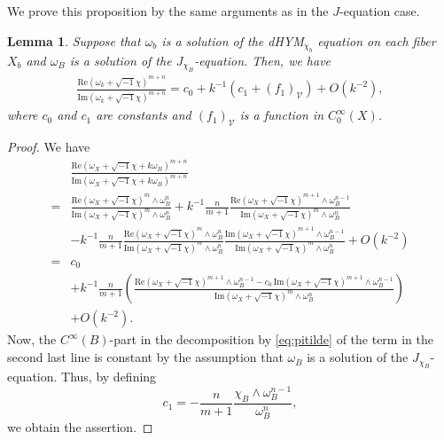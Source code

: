 \documentclass{amsart}
\numberwithin{equation}{section}
\theoremstyle{plain}
\newtheorem{lemma}[equation]{Lemma}
\theoremstyle{definition}
\theoremstyle{remark}
\begin{document}
We prove this proposition by the same arguments as in the $J$-equation case.

\begin{lemma}\label{lem:dhymO(1)-term}
Suppose that $\omega_b$ is a solution of the dHYM$_{\chi_b}$ equation on each fiber $X_b$ and $\omega_B$ is a solution of the $J_{\chi_B}$-equation. Then, we have
\begin{align*}
    \frac{\mathrm{Re}(\omega_k+\sqrt{-1}\chi)^{m+n}}{\mathrm{Im}(\omega_k+\sqrt{-1}\chi)^{m+n}}
    =c_0+k^{-1}\left(c_1+(f_1)_{\mathcal{V}}\right)+O(k^{-2}),
\end{align*}
where $c_0$ and $c_1$ are constants and $(f_1)_{\mathcal{V}}$ is a function in $C^\infty_0(X)$.
\end{lemma}

\begin{proof}
    We have
    \begin{align*}
        &\frac{\mathrm{Re}(\omega_X+\sqrt{-1}\chi+k\omega_B)^{m+n}}{\mathrm{Im}(\omega_X+\sqrt{-1}\chi+k\omega_B)^{m+n}}\\
        =&\frac{\mathrm{Re}(\omega_X+\sqrt{-1}\chi)^m\wedge\omega_B^n}{\mathrm{Im}(\omega_X+\sqrt{-1}\chi)^m\wedge\omega_B^n}+k^{-1}\frac{n}{m+1}\frac{\mathrm{Re}(\omega_X+\sqrt{-1}\chi)^{m+1}\wedge\omega_B^{n-1}}{\mathrm{Im}(\omega_X+\sqrt{-1}\chi)^m\wedge\omega_B^n}\\
        &-k^{-1}\frac{n}{m+1}\frac{\mathrm{Re}(\omega_X+\sqrt{-1}\chi)^m\wedge\omega_B^n}{\mathrm{Im}(\omega_X+\sqrt{-1}\chi)^m\wedge\omega_B^n}\frac{\mathrm{Im}(\omega_X+\sqrt{-1}\chi)^{m+1}\wedge\omega_B^{n-1}}{\mathrm{Im}(\omega_X+\sqrt{-1}\chi)^m\wedge\omega_B^n}+O(k^{-2})\\
        =&c_0\\
        &+k^{-1}\frac{n}{m+1}\left(\frac{\mathrm{Re}(\omega_X+\sqrt{-1}\chi)^{m+1}\wedge\omega^{n-1}_B-c_0\,\mathrm{Im}(\omega_X+\sqrt{-1}\chi)^{m+1}\wedge\omega_B^{n-1}}{\mathrm{Im}(\omega_X+\sqrt{-1}\chi)^m\wedge\omega_B^n}\right)\\
        &+O(k^{-2}).
    \end{align*}
    Now, the $C^\infty(B)$-part in the decomposition by \eqref{eq:pitilde} of the term in the second last line is constant by the assumption that $\omega_B$ is a solution of the $J_{\chi_B}$-equation. Thus, by defining
    \begin{equation}\label{eq:dhymc_1}
        c_1=-\frac{n}{m+1}\frac{\chi_B\wedge\omega_B^{n-1}}{\omega_B^n},
    \end{equation}
    we obtain the assertion.
\end{proof}
\end{document}
